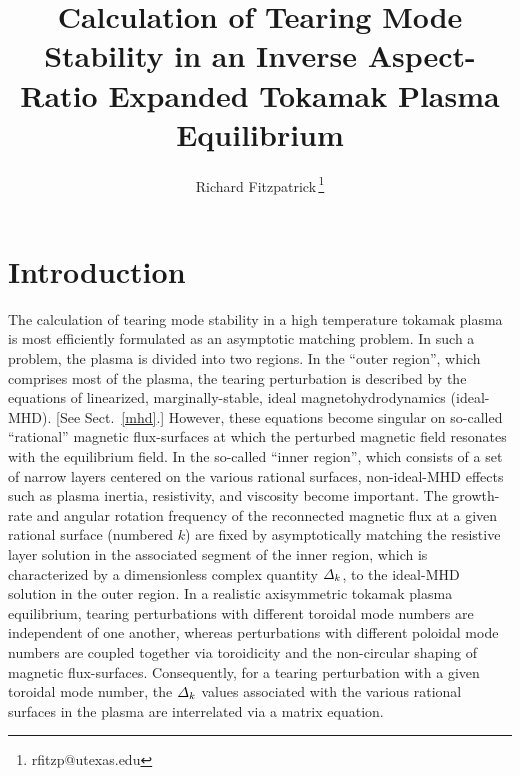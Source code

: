 \documentclass[12pt,prb,aps]{revtex4-1}
\begin{document}
\title{Calculation of Tearing Mode Stability in an Inverse Aspect-Ratio Expanded Tokamak Plasma Equilibrium}
\author{Richard Fitzpatrick\,\footnote{rfitzp@utexas.edu}}

\maketitle

\section{Introduction} 
The calculation of tearing mode stability in a high temperature tokamak plasma is most efficiently formulated as  an asymptotic
matching problem.\cite{fkr} In such a problem, the  plasma is  divided into two regions. In the ``outer region'', which comprises most
of the plasma, the tearing perturbation is described by the equations of linearized, marginally-stable, ideal magnetohydrodynamics (ideal-MHD). [See Sect.~\ref{mhd}.]
However, these equations become singular on so-called ``rational'' magnetic flux-surfaces at which the perturbed magnetic field resonates with the equilibrium field. In the so-called ``inner region'', which
consists of a set of narrow layers centered on the various rational surfaces, non-ideal-MHD effects such as plasma inertia, resistivity, and
viscosity become important. The growth-rate and angular rotation frequency of the reconnected magnetic flux at a given rational
surface (numbered $k$) are fixed by asymptotically matching the resistive layer
solution in the associated segment of the inner region, which is characterized by a dimensionless complex quantity ${\mit\Delta}_k$,  to the ideal-MHD solution in the outer region. In a realistic axisymmetric tokamak  plasma equilibrium, tearing
perturbations with different toroidal mode numbers are independent of one another, whereas perturbations with different poloidal
mode numbers are coupled together via toroidicity and the non-circular shaping of magnetic flux-surfaces.\cite{con0}
Consequently, for a tearing perturbation with a given toroidal mode number, 
 the ${\mit\Delta}_k$ values associated with  the various rational surfaces in the plasma are interrelated via a matrix equation.\cite{connor,cht,tokuda,brennan, ham,am1,am3}
\end{document}
